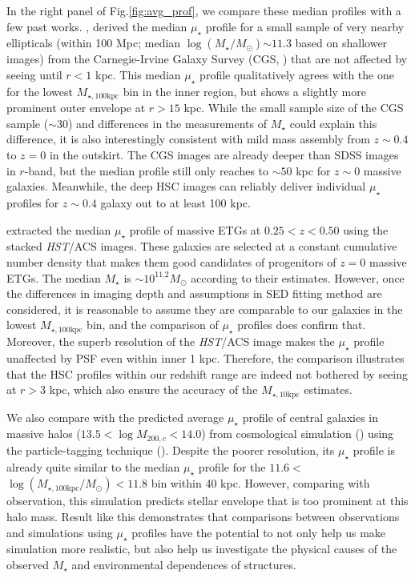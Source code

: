 \documentclass{emulateapj}
\def\mstar{{$M_{\star}$}}
\def\logms{{$\log (M_{\star}/M_{\odot})$}}
\def\minn{{$M_{\star,10\mathrm{kpc}}$}}
\def\mtot{{$M_{\star,100\mathrm{kpc}}$}}
\def\logmtot{{$\log (M_{\star,100\mathrm{kpc}}/M_{\odot})$}}
\def\mden{{$\mu_{\star}$}}
\begin{document}
\begin{CJK*}{UTF8}{gbsn}
    In the right panel of Fig.\ref{fig:avg_prof}, we compare these median profiles with 
    a few past works.  
    \citep{Huang2013a}, derived the median \mden{} profile for a small sample of very 
    nearby ellipticals (within 100 Mpc; median \logms{}$\sim 11.3$ based on shallower 
    images) from the Carnegie-Irvine Galaxy Survey (CGS, \citealt{CGS1}) that are not 
    affected by seeing until $r < 1$ kpc.
    This median \mden{} profile qualitatively agrees with the one for the lowest 
    \mtot{} bin in the inner region, but shows a slightly more prominent outer 
    envelope at $r > 15$ kpc. 
    While the small sample size of the CGS sample ($\sim 30$) and differences in the
    measurements of \mstar{} could explain this difference, it is also interestingly 
    consistent with mild mass assembly from $z\sim 0.4$ to $z=0$ in the outskirt.   
    The CGS images are already deeper than SDSS images in $r$-band, but the median 
    profile still only reaches to $\sim 50$ kpc for $z\sim 0$ massive galaxies.
    Meanwhile, the deep HSC images can reliably deliver individual \mden{} profiles 
    for $z\sim 0.4$ galaxy out to at least 100 kpc.  

    \citet{Patel2013} extracted the median \mden{} profile of massive ETGs at 
    $0.25 < z < 0.50$ using the stacked \textit{HST}/ACS images. 
    These galaxies are selected at a constant cumulative number density that makes them  
    good candidates of progenitors of $z=0$ massive ETGs.  
    The median \mstar{} is $\sim 10^{11.2} M_{\odot}$ according to their estimates.  
    However, once the differences in imaging depth and assumptions in SED fitting method
    are considered, it is reasonable to assume they are comparable to our galaxies in 
    the lowest \mtot{} bin, and the comparison of \mden{} profiles does confirm that.
    Moreover, the superb resolution of the \textit{HST}/ACS image makes the \mden{} 
    profile unaffected by PSF even within inner 1 kpc.
    Therefore, the comparison illustrates that the HSC profiles within our redshift
    range are indeed not bothered by seeing at $r > 3$ kpc, which also ensure the
    accuracy of the \minn{} estimates.
  
    We also compare with the predicted average \mden{} profile of central galaxies in 
    massive halos ($13.5 < \log M_{200,c} < 14.0$) from cosmological simulation
    (\citealt{Cooper13}) using the particle-tagging technique (\citealt{Cooper10}).
    Despite the poorer resolution, its \mden{} profile is already quite similar to 
    the median \mden{} profile for the $11.6 <$\logmtot{}$< 11.8$ bin within 40 kpc. 
    However, comparing with observation, this simulation predicts stellar envelope that
    is too prominent at this halo mass.
    Result like this demonstrates that comparisons between observations and simulations
    using \mden{} profiles have the potential to not only help us make simulation
    more realistic, but also help us investigate the physical causes of the observed
    \mstar{} and environmental dependences of structures.
    

\end{CJK*}
\end{document}
